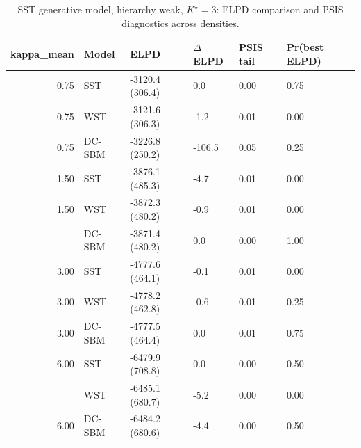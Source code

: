 \begin{table}
\centering
\caption{SST generative model, hierarchy weak, $K^\star=3$: ELPD comparison and PSIS diagnostics across densities.}
\centering
\begin{tabular}[t]{rlllll}
\toprule
kappa_mean & Model & ELPD & $\Delta$ELPD & PSIS tail & Pr(best ELPD)\\
\midrule
0.75 & SST & -3120.4 (306.4) & 0.0 & 0.00 & 0.75\\
0.75 & WST & -3121.6 (306.3) & -1.2 & 0.01 & 0.00\\
0.75 & DC-SBM & -3226.8 (250.2) & -106.5 & 0.05 & 0.25\\
1.50 & SST & -3876.1 (485.3) & -4.7 & 0.01 & 0.00\\
1.50 & WST & -3872.3 (480.2) & -0.9 & 0.01 & 0.00\\
\addlinespace
1.50 & DC-SBM & -3871.4 (480.2) & 0.0 & 0.00 & 1.00\\
3.00 & SST & -4777.6 (464.1) & -0.1 & 0.01 & 0.00\\
3.00 & WST & -4778.2 (462.8) & -0.6 & 0.01 & 0.25\\
3.00 & DC-SBM & -4777.5 (464.4) & 0.0 & 0.01 & 0.75\\
6.00 & SST & -6479.9 (708.8) & 0.0 & 0.00 & 0.50\\
\addlinespace
6.00 & WST & -6485.1 (680.7) & -5.2 & 0.00 & 0.00\\
6.00 & DC-SBM & -6484.2 (680.6) & -4.4 & 0.00 & 0.50\\
\bottomrule
\end{tabular}
\end{table}
